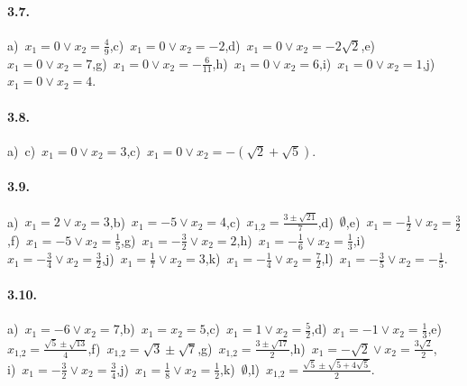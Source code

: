 \paragraph{3.7.} a)~$x_{1} = 0 \vee x_{2} = \frac{4}{9}$,\quad c)~$x_{1} = 0 \vee x_{2} = - 2$,\quad d)~$x_{1} = 0 \vee x_{2} = -2\sqrt{2}$,\quad e)~$x_{1} = 0 \vee x_{2} = 7$,\quad g)~$x_{1} = 0 \vee x_{2} = - \frac{6}{11}$,\quad h)~$x_{1} = 0 \vee x_{2} = 6$,\quad i)~$x_{1} = 0 \vee x_{2} = 1$,\quad j)~$x_{1} = 0 \vee x_{2} = 4$.


\paragraph{3.8.} a)~c)~$x_{1} = 0 \vee x_{2} = 3$,\quad c)~$x_{1} = 0 \vee x_{2} = - (\sqrt{2} + \sqrt{5})$.

\paragraph{3.9.} a)~$x_{1}=2\vee x_{2}=3$,\quad b)~$x_{1}=-5\vee x_{2}=4$,\quad c)~$x_{1\text{,}2}=\frac{3 \pm \sqrt{21}}{7}$,\quad d)~$\emptyset$,\quad e)~$x_{1}=-\frac{1}{2}\vee x_{2}=\frac{3}{2}$,\quad f)~$x_{1}=-5\vee x_{2}=\frac{1}{5}$,\quad g)~$x_{1}=-\frac{3}{2}\vee x_{2}=2$,\quad h)~$x_{1}=-\frac{1}{6}\vee x_{2}=\frac{1}{3}$,\quad i)~$x_{1}=-\frac{3}{4}\vee x_{2}=\frac{3}{2}$,\quad j)~$x_{1}=\frac{1}{7}\vee x_{2}=3$,\quad k)~$x_{1}=-\frac{1}{4}\vee x_{2}=\frac{7}{2}$,\quad l)~$x_{1}=-\frac{3}{5}\vee x_{2}=-\frac{1}{5}$.

\paragraph{3.10.} a)~$x_{1} =-6 \vee x_{2} = 7$,\quad b)~$x_{1} = x_{2} = 5$,\quad c)~$x_{1} = 1 \vee x_{2} = \frac{5}{2}$,\quad d)~$x_{1} =-1 \vee x_{2} = \frac{1}{3}$,\quad e)~$x_{1\text{,}2} = \frac{\sqrt{5} \pm \sqrt{13}}{4}$,\quad f)~$x_{1\text{,}2} = \sqrt{3} \pm \sqrt{7}$,\quad g)~$x_{1\text{,}2} = \frac{3 \pm \sqrt{17}}{2}$,\quad h)~$x_{1} =-\sqrt{2} \vee x_{2} = \frac{3 \sqrt{2}}{2}$,\protect\\
i)~$x_{1} =-\frac{3}{2} \vee x_{2} = \frac{3}{4}$,\quad j)~$x_{1} = \frac{1}{8} \vee x_{2} = \frac{1}{2}$,\quad k)~$\emptyset$,\quad l)~$x_{1\text{,}2} = \frac{\sqrt{5} \pm \sqrt{5 + 4 \sqrt{5}}}{2}$.

